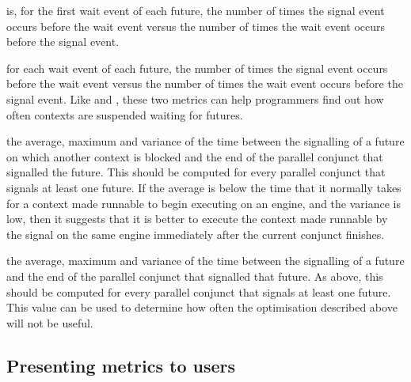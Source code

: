 
is, for the first wait event of each future,
the number of times the signal event occurs before the wait event versus
the number of times the wait event occurs before the signal event.

for each wait event of each future,
the number of times the signal event occurs before the wait event versus
the number of times the wait event occurs before the signal event.
Like  and
,
these two metrics can help programmers find out
how often contexts are suspended waiting for futures.

the average, maximum and variance of the time
between the signalling of a future on which another context is blocked
and the end of the parallel conjunct that signalled the future.
This should be computed for every parallel conjunct
that signals at least one future.
If the average is below the time that it normally takes
for a context made runnable to begin executing on an engine,
and the variance is low, then it suggests that
it is better to execute the context made runnable by the signal
on the same engine immediately after the current conjunct finishes.

the average, maximum and variance of the time
between the signalling of a future
and the end of the parallel conjunct that signalled that future.
As above, this should be computed for
every parallel conjunct that signals at least one future.
This value can be used to determine
how often the optimisation described above will not be useful.

\subsection{Presenting metrics to users}

